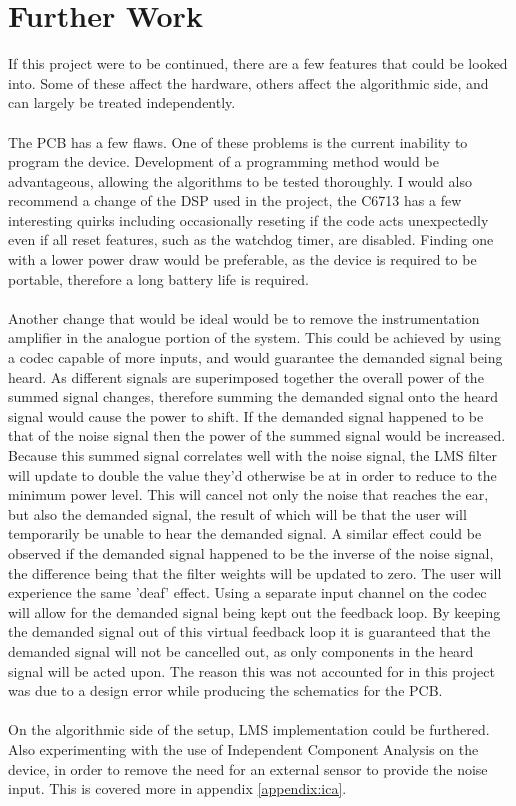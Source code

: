 \section{Further Work}

If this project were to be continued, there are a few features that could be looked into.
Some of these affect the hardware, others affect the algorithmic side, and can largely be treated independently.
\\
\\
The PCB has a few flaws.
One of these problems is the current inability to program the device.
Development of a programming method would be advantageous, allowing the algorithms to be tested thoroughly.
I would also recommend a change of the DSP used in the project, the C6713 has a few interesting quirks including occasionally reseting if the code acts unexpectedly even if all reset features, such as the watchdog timer, are disabled.
Finding one with a lower power draw would be preferable, as the device is required to be portable, therefore a long battery life is required.
\\
\\
Another change that would be ideal would be to remove the instrumentation amplifier in the analogue portion of the system.
This could be achieved by using a codec capable of more inputs, and would guarantee the demanded signal being heard.
As different signals are superimposed together the overall power of the summed signal changes, therefore summing the demanded signal onto the heard signal would cause the power to shift.
If the demanded signal happened to be that of the noise signal then the power of the summed signal would be increased.
Because this summed signal correlates well with the noise signal, the LMS filter will update to double the value they'd otherwise be at in order to reduce to the minimum power level.
This will cancel not only the noise that reaches the ear, but also the demanded signal, the result of which will be that the user will temporarily be unable to hear the demanded signal.
A similar effect could be observed if the demanded signal happened to be the inverse of the noise signal, the difference being that the filter weights will be updated to zero.
The user will experience the same 'deaf' effect.
Using a separate input channel on the codec will allow for the demanded signal being kept out the feedback loop.
By keeping the demanded signal out of this virtual feedback loop it is guaranteed that the demanded signal will not be cancelled out, as only components in the heard signal will be acted upon.
The reason this was not accounted for in this project was due to a design error while producing the schematics for the PCB.
\label{text:virtualfeedbackassumption}
\\
\\
On the algorithmic side of the setup, LMS implementation could be furthered.
Also experimenting with the use of Independent Component Analysis on the device, in order to remove the need for an external sensor to provide the noise input.
This is covered more in appendix \ref{appendix:ica}.
